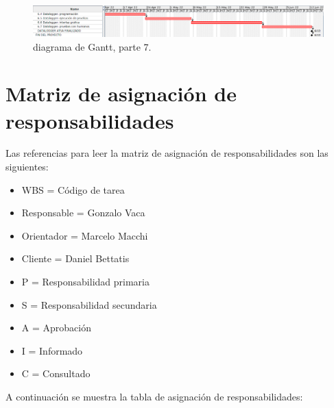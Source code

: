 \documentclass[
12pt,
spanish,
singlespacing,
parskip,
headsepline,]{article}
\begin{document}
\begin{figure}[H]
	\centering
	\includegraphics[width=\textwidth]{Figuras/gantt07.png}
	\caption{diagrama de Gantt, parte 7.}
	\label{fig:gantt7}
\end{figure}

\section{Matriz de asignación de responsabilidades}

Las referencias para leer la matriz de asignación de responsabilidades son las siguientes:

\begin{itemize}
	\item WBS = Código de tarea
	\item Responsable = Gonzalo Vaca
	\item Orientador = Marcelo Macchi
	\item Cliente = Daniel Bettatis
	\item P = Responsabilidad primaria
	\item S = Responsabilidad secundaria
	\item A = Aprobación
	\item I = Informado
	\item C = Consultado
\end{itemize}

A continuación se muestra la tabla de asignación de responsabilidades:
\end{document}
